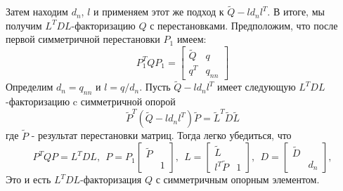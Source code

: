 \documentclass[12pt]{matmex-diploma}
\begin{document}
Затем находим $d_n$, $l$ и применяем этот же подход к $\tilde{Q}−l d_n l^T$.
В итоге, мы получим $L^TDL$-факторизацию $Q$ с перестановками. Предположим,
что после первой симметричной перестановки $P_1$ имеем:
\begin{equation*}
    P^T_1QP_1 =
     \begin{bmatrix}
     \tilde{Q} & q \\
     q^T & q_{nn}
     \end{bmatrix}
\end{equation*}
Определим $d_n = q_{nn}$ и $l = q / d_n$. Пусть $\tilde{Q} - ld_nl^T$ имеет
следующую $L^TDL$-факторизацию c симметричной опорой
\begin{equation*}
     \tilde{P}^T(\tilde{Q} - ld_nl^T)\tilde{P} = \tilde{L}^T\tilde{D}\tilde{L}
\end{equation*}
где $\tilde{P}$ - результат перестановки матриц. Тогда легко убедиться, что
\begin{equation*}
    P^TQP = L^TDL, \ \ P = P_1 
    \begin{bmatrix}
    \tilde{P} &   \\
    & 1
    \end{bmatrix}, \ \
    L = \begin{bmatrix}
    \tilde{L} &   \\
    l^T\tilde{P} & 1
    \end{bmatrix}, \ \
    D = \begin{bmatrix}
            \tilde{D} &   \\
            & d_n
        \end{bmatrix},
\end{equation*}
Это и есть $L^TDL$-факторизация $Q$ с симметричным опорным элементом. 
\end{document}
